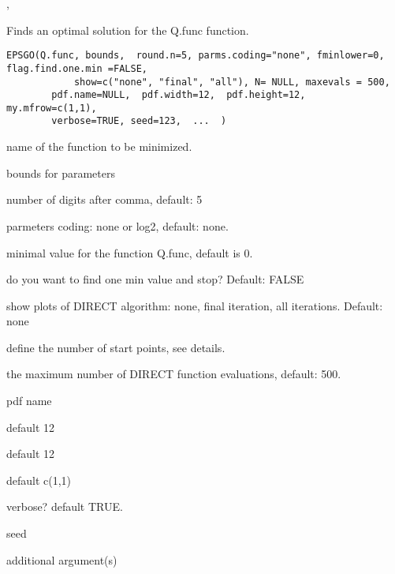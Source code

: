 \documentclass[letterpaper]{book}
\begin{document}
%
\begin{SeeAlso}\relax
{}, 
\end{SeeAlso}
%
\begin{Description}\relax
Finds an optimal solution for the Q.func function.
\end{Description}
%
\begin{Usage}
\begin{verbatim}
EPSGO(Q.func, bounds,  round.n=5, parms.coding="none", fminlower=0, flag.find.one.min =FALSE,
			show=c("none", "final", "all"), N= NULL, maxevals = 500,  
	    pdf.name=NULL,  pdf.width=12,  pdf.height=12,   my.mfrow=c(1,1), 
	    verbose=TRUE, seed=123,  ...  )
\end{verbatim}
\end{Usage}
%
\begin{Arguments}
\begin{ldescription}
\item[\code{Q.func}]  name of the function to be  minimized. 
\item[\code{bounds}]  bounds for parameters
\item[\code{round.n}]  number of digits after comma, default: 5          
\item[\code{parms.coding}]  parmeters coding: none  or log2, default: none.  
\item[\code{fminlower}]  minimal value for the function Q.func, default is 0.     
\item[\code{flag.find.one.min}]   do you want to find one min value and stop? Default: FALSE 
\item[\code{show}]   show plots of  DIRECT algorithm:    none, final iteration, all iterations. Default: none  
\item[\code{N}]  define the number of start points, see details. 
\item[\code{maxevals}]  the maximum number of DIRECT function evaluations, default: 500.   
\item[\code{pdf.name}] pdf name        
\item[\code{pdf.width}]  default 12 
\item[\code{pdf.height}]  default 12 
\item[\code{my.mfrow}]  default c(1,1) 
\item[\code{verbose}]  verbose? default TRUE. 
\item[\code{seed}]  seed 
\item[\code{...}]  additional argument(s) 
\end{ldescription}
\end{Arguments}
\end{document}
